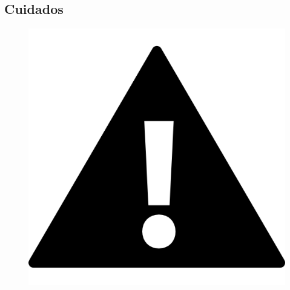 \subsection*{Cuidados}
    
    \begin{figure}[H]
    \centering
	\label{iconeimportante}
		\includegraphics[keepaspectratio=true,scale=1.4]{Figuras/bateria/iconeimportante.png}
	\label{iconeimportante}
	\end{figure} 
    
